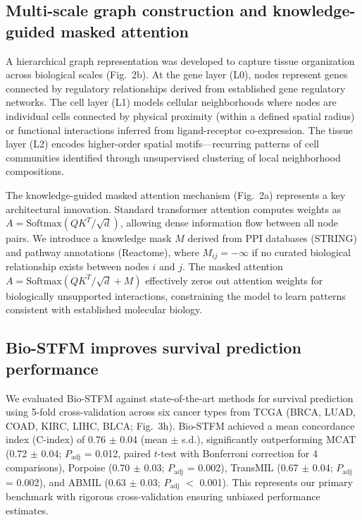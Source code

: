 \documentclass[pdflatex,sn-nature]{sn-jnl}%
\theoremstyle{thmstyleone}%
\theoremstyle{thmstyletwo}%
\theoremstyle{thmstylethree}%
\begin{document}
\subsection{Multi-scale graph construction and knowledge-guided masked attention}\label{subsec2}

A hierarchical graph representation was developed to capture tissue organization across biological scales (Fig.~2b)\cite{bib36,bib41}. At the gene layer (L0), nodes represent genes connected by regulatory relationships derived from established gene regulatory networks. The cell layer (L1) models cellular neighborhoods where nodes are individual cells connected by physical proximity (within a defined spatial radius) or functional interactions inferred from ligand-receptor co-expression\cite{bib49}. The tissue layer (L2) encodes higher-order spatial motifs---recurring patterns of cell communities identified through unsupervised clustering of local neighborhood compositions\cite{bib32}.

The knowledge-guided masked attention mechanism (Fig.~2a) represents a key architectural innovation. Standard transformer attention computes weights as $A = \text{Softmax}(QK^T/\sqrt{d})$, allowing dense information flow between all node pairs. We introduce a knowledge mask $M$ derived from PPI databases (STRING) and pathway annotations (Reactome), where $M_{ij} = -\infty$ if no curated biological relationship exists between nodes $i$ and $j$. The masked attention $A = \text{Softmax}(QK^T/\sqrt{d} + M)$ effectively zeros out attention weights for biologically unsupported interactions, constraining the model to learn patterns consistent with established molecular biology.

\subsection{Bio-STFM improves survival prediction performance}\label{subsec3}

We evaluated Bio-STFM against state-of-the-art methods for survival prediction using 5-fold cross-validation across six cancer types from TCGA (BRCA, LUAD, COAD, KIRC, LIHC, BLCA; Fig.~3h). Bio-STFM achieved a mean concordance index (C-index) of 0.76 $\pm$ 0.04 (mean $\pm$ s.d.), significantly outperforming MCAT\cite{bib6} (0.72 $\pm$ 0.04; $P_{\text{adj}}$ = 0.012, paired $t$-test with Bonferroni correction for 4 comparisons), Porpoise\cite{bib23} (0.70 $\pm$ 0.03; $P_{\text{adj}}$ = 0.002), TransMIL\cite{bib18} (0.67 $\pm$ 0.04; $P_{\text{adj}}$ = 0.002), and ABMIL\cite{bib4} (0.63 $\pm$ 0.03; $P_{\text{adj}}$ $<$ 0.001). This represents our primary benchmark with rigorous cross-validation ensuring unbiased performance estimates.
\end{document}
